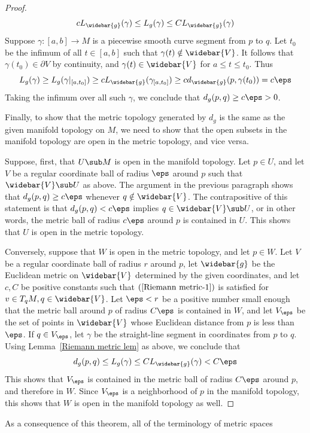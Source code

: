 \begin{proof}
\[cL_{\widebar{g}}(\gamma)\leq L_g(\gamma)\leq CL_{\widebar{g}}(\gamma)\]
Suppose $\gamma:[a,b]\to M$ is a piecewise smooth curve segment from $p$ to $q$. Let $t_0$ be the infimum of all $t\in[a,b]$ such that $\gamma(t)\notin\widebar{V}$. It follows that $\gamma(t_0)\in\partial V$ by continuity, and $\gamma(t)\in\widebar{V}$ for $a\leq t\leq t_0$. Thus
\[L_g(\gamma)\geq L_g(\gamma|_{[a,t_0]})\geq cL_{\widebar{g}}(\gamma_{[a,t_0]})\geq cd_{\widebar{g}}(p,\gamma(t_0))=c\eps\]
Taking the infimum over all such $\gamma$, we conclude that $d_g(p,q)\geq c\eps>0$.\par
Finally, to show that the metric topology generated by $d_g$ is the same as the given manifold topology on $M$, we need to show that the open subsets in the manifold 
topology are open in the metric topology, and vice versa.\par
Suppose, first, that $U\sub M$ is open in the manifold topology. Let $p\in U$, and let $V$ be a regular coordinate ball of radius $\eps$ around $p$ such that 
$\widebar{V}\sub U$ as above. The argument in the previous paragraph shows that $d_g(p,q)\geq c\eps$ whenever $q\notin\widebar{V}$. The contrapositive of this 
statement is that $d_g(p,q)<c\eps$ implies $q\in\widebar{V}\sub U$, or in other words, the metric ball of radius $c\eps$ around $p$ is contained in $U$. This 
shows that $U$ is open in the metric topology.\par
Conversely, suppose that $W$ is open in the metric topology, and let $p\in W$. Let $V$ be a regular coordinate ball of radius $r$ around $p$, let $\widebar{g}$ 
be the Euclidean metric on $\widebar{V}$ determined by the given coordinates, and let $c,C$ be positive constants such that $(\ref{Riemann metric-1})$ is satisfied 
for $v\in T_qM,q\in\widebar{V}$. Let $\eps<r$ be a positive number small enough that the metric ball around $p$ of radius $C\eps$ is contained in $W$, and let 
$V_\eps$ be the set of points in $\widebar{V}$ whose Euclidean distance from $p$ is less than $\eps$. If $q\in V_\eps$, let $\gamma$ be the straight-line segment 
in coordinates from $p$ to $q$. Using Lemma~\ref{Riemann metric lem} as above, we conclude that
\[d_g(p,q)\leq L_g(\gamma)\leq CL_{\widebar{g}}(\gamma)<C\eps\]
This shows that $V_\eps$ is contained in the metric ball of radius $C\eps$ around $p$, and therefore in $W$. Since $V_\eps$ is a neighborhood of $p$ in the manifold 
topology, this shows that $W$ is open in the manifold topology as well.
\end{proof}
As a consequence of this theorem, all of the terminology of metric spaces 
